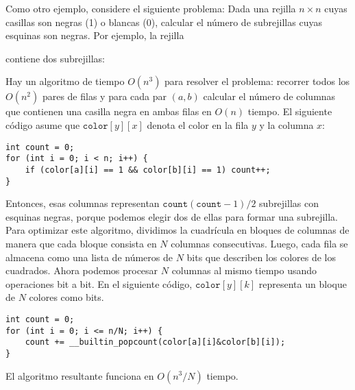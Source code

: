 Como otro ejemplo, considere el siguiente problema:
Dada una rejilla $n \times n$ cuyas casillas son negras (1) o blancas (0), calcular el número de subrejillas cuyas esquinas son negras.
Por ejemplo, la rejilla
\begin{center}
\end{center}
contiene dos subrejillas:
\begin{center}
\end{center}

Hay un algoritmo de tiempo $O(n^3)$ para resolver el problema:
recorrer todos los $O(n^2)$ pares de filas y para cada par $(a,b)$ calcular el número de columnas que contienen una casilla negra en ambas filas en $O(n)$ tiempo.
El siguiente código asume que $\texttt{color}[y][x]$ denota el color en la fila $y$ y la columna $x$:
\begin{lstlisting}
int count = 0;
for (int i = 0; i < n; i++) {
    if (color[a][i] == 1 && color[b][i] == 1) count++;
}
\end{lstlisting}
Entonces, esas columnas representan $\texttt{count}(\texttt{count}-1)/2$ subrejillas con esquinas negras,
porque podemos elegir dos de ellas para formar una subrejilla.
Para optimizar este algoritmo, dividimos la cuadrícula en bloques
de columnas de manera que cada bloque consista en $N$
columnas consecutivas. Luego, cada fila se almacena como
una lista de números de $N$ bits que describen los colores
de los cuadrados. Ahora podemos procesar $N$ columnas al mismo tiempo
usando operaciones bit a bit. En el siguiente código,
$\texttt{color}[y][k]$ representa
un bloque de $N$ colores como bits.
\begin{lstlisting}
int count = 0;
for (int i = 0; i <= n/N; i++) {
    count += __builtin_popcount(color[a][i]&color[b][i]);
}
\end{lstlisting}
El algoritmo resultante funciona en $O(n^3/N)$ tiempo.

